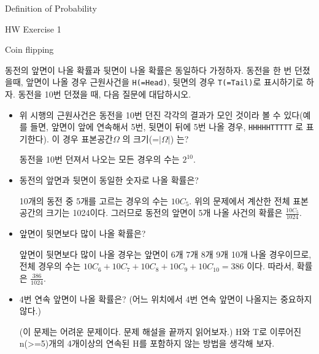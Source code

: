 \begin{edXchapter}{Definition of Probability}

\begin{edXsection}{HW Exercise 1}

\begin{edXvertical}

\begin{edXproblem}{Coin flipping}

동전의 앞면이 나올 확률과 뒷면이 나올 확률은 동일하다 가정하자. 동전을 한 번 던졌을때,
앞면이 나올 경우 근원사건을 {\tt H(=Head)}, 뒷면의 경우 {\tt T(=Tail)}로 표시하기로 하자.
동전을 10번 던졌을 때, 다음 질문에 대답하시오.


\begin{itemize}
\item 위 시행의 근원사건은 동전을 10번 던진 각각의  결과가 모인 것이라 볼 수 있다(예를 들면, 앞면이 앞에 연속해서 5번, 뒷면이 뒤에 5번 나올 경우, {\tt HHHHHTTTTT} 로 표기한다).  
이 경우 표본공간$\Omega$ 의 크기(=$|\Omega|$) 는?
\begin{edXsolution}
동전을 10번 던져서 나오는 모든 경우의 수는 $2^{10}$.
\end{edXsolution}
\item 동전의 앞면과 뒷면이 동일한 숫자로 나올 확률은?
\begin{edXsolution}
10개의 동전 중 5개를 고르는 경우의 수는 $10C_5$.
위의 문제에서 계산한 전체 표본공간의 크기는 1024이다. 그러므로 동전의 앞면이 5개 나올 사건의 확률은 $\frac{10C_5}{1024}$.
\end{edXsolution}
\item 앞면이 뒷면보다 많이 나올 확률은?
\begin{edXsolution}
앞면이 뒷면보다 많이 나올 경우는 앞면이 6개 7개 8개 9개 10개 나올 경우이므로, 
전체 경우의 수는 $10C_6 + 10C_7 + 10C_8 + 10C_9 + 10C_{10} = 386 $ 이다.
따라서, 확률은 $\frac{386}{1024}$.
\end{edXsolution}
\item 4번 연속 앞면이 나올 확률은? (어느 위치에서 4번 연속 앞면이 나올지는 중요하지 않다.) 
\begin{edXsolution}
(이 문제는 어려운 문제이다. 문제 해설을 끝까지 읽어보자.) H와 T로 이루어진 n(>=5)개의 4개이상의 연속된 H를 포함하지 않는 방법을 생각해 보자.

\end{edXsolution}
\end{itemize}
\end{edXproblem}
\end{edXvertical}
\end{edXsection}
\end{edXchapter}
